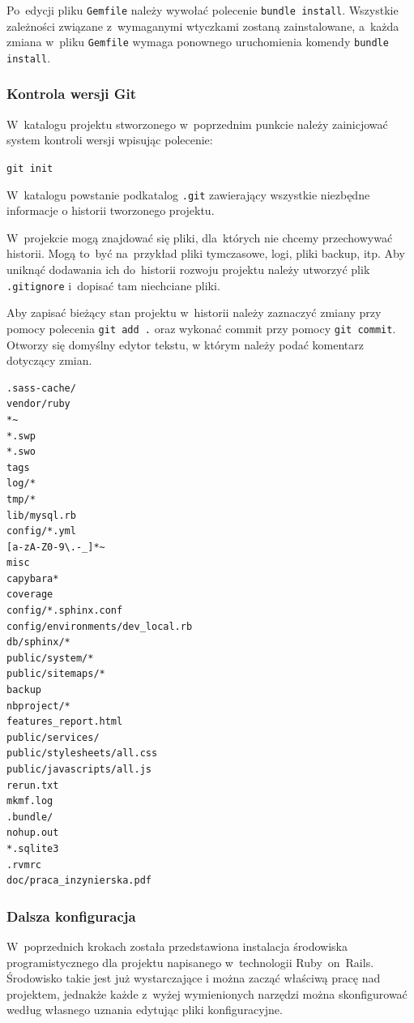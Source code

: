 Po~edycji pliku \texttt{Gemfile} należy wywołać polecenie \texttt{bundle install}. Wszystkie zależności związane z~wymaganymi wtyczkami zostaną zainstalowane, a~każda zmiana w~pliku \texttt{Gemfile} wymaga ponownego uruchomienia komendy \texttt{bundle install}.

\subsubsection{Kontrola wersji Git}

W~katalogu projektu stworzonego w~poprzednim punkcie należy zainicjować system kontroli wersji wpisując polecenie:


\verb+git init+


W~katalogu powstanie podkatalog \texttt{.git} zawierający wszystkie niezbędne informacje o historii tworzonego projektu.


W~projekcie mogą znajdować się pliki, dla~których nie chcemy przechowywać historii. Mogą to~być na~przykład pliki tymczasowe, logi, pliki backup, itp. Aby uniknąć dodawania ich do~historii rozwoju projektu należy utworzyć plik \texttt{.gitignore} i~dopisać tam niechciane pliki.


Aby zapisać bieżący stan projektu w~historii należy zaznaczyć zmiany przy pomocy polecenia \verb+git add .+ oraz wykonać commit przy pomocy \verb+git commit+. Otworzy się domyślny edytor tekstu, w którym należy podać komentarz dotyczący zmian.

 \label{code.railsdir}
\begin{lstlisting}
.sass-cache/
vendor/ruby
*~
*.swp
*.swo
tags
log/*
tmp/*
lib/mysql.rb
config/*.yml
[a-zA-Z0-9\.-_]*~
misc
capybara*
coverage
config/*.sphinx.conf
config/environments/dev_local.rb
db/sphinx/*
public/system/*
public/sitemaps/*
backup
nbproject/*
features_report.html
public/services/
public/stylesheets/all.css
public/javascripts/all.js
rerun.txt
mkmf.log
.bundle/
nohup.out
*.sqlite3
.rvmrc
doc/praca_inzynierska.pdf
\end{lstlisting}

\subsubsection{Dalsza konfiguracja}

W~poprzednich krokach została przedstawiona instalacja środowiska programistycznego dla projektu napisanego w~technologii Ruby~on~Rails. Środowisko takie jest już wystarczające i można zacząć właściwą pracę nad projektem, jednakże każde z~wyżej wymienionych narzędzi można skonfigurować według własnego uznania edytując pliki konfiguracyjne.



